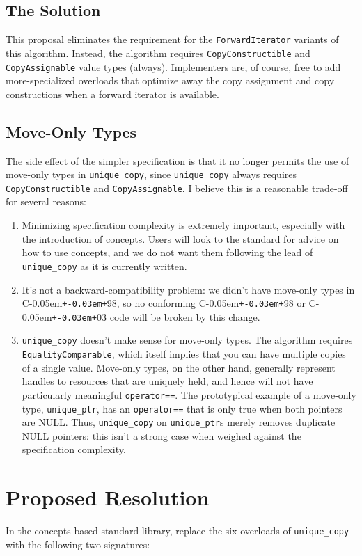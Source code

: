 \documentclass[american]{article}
\newcommand{\code}[1]{\lstinline[basicstyle=\sffamily,keywords={}]{#1}}
\newcommand{\Cpp}{C\kern-0.05em\texttt{+\kern-0.03em+}}
\newcommand{\tcode}[1]{\code{#1}}
\begin{document}
\subsection{The Solution}
This proposal eliminates the requirement for the
\tcode{ForwardIterator} variants of this algorithm. Instead, the
algorithm requires \tcode{CopyConstructible} and
\tcode{CopyAssignable} value types (always). Implementers are, of
course, free to add more-specialized overloads that optimize away the
copy assignment and copy constructions when a forward iterator is
available.

\subsection{Move-Only Types}
The side effect of the simpler specification is that it no longer
permits the use of move-only types in \tcode{unique_copy}, since
\tcode{unique_copy} always requires \tcode{CopyConstructible} and
\tcode{CopyAssignable}. I believe this is a reasonable trade-off for
several reasons:

\begin{enumerate}
\item Minimizing specification complexity is extremely important,
  especially with the introduction of concepts. Users will look to the
  standard for advice on how to use concepts, and we do not want them
  following the lead of \tcode{unique_copy} as it is currently
  written.
\item It's not a backward-compatibility problem: we didn't have
  move-only types in \Cpp98, so no conforming \Cpp98 or \Cpp03 code
  will be broken by this change.
\item \tcode{unique_copy} doesn't make sense for move-only types. The
  algorithm requires \tcode{EqualityComparable}, which itself implies
  that you can have multiple copies of a single value. Move-only
  types, on the other hand, generally represent handles to resources
  that are uniquely held, and hence will not have particularly
  meaningful \tcode{operator==}. The prototypical example of a
  move-only type, \tcode{unique_ptr}, has an \tcode{operator==} that
  is only true when both pointers are NULL. Thus, \tcode{unique_copy}
  on \tcode{unique_ptr}s merely removes duplicate NULL pointers: this
  isn't a strong case when weighed against the specification complexity.
\end{enumerate}

\section{Proposed Resolution}
In the concepts-based standard library, replace the six overloads of
\tcode{unique_copy} with the following two signatures:
\end{document}

